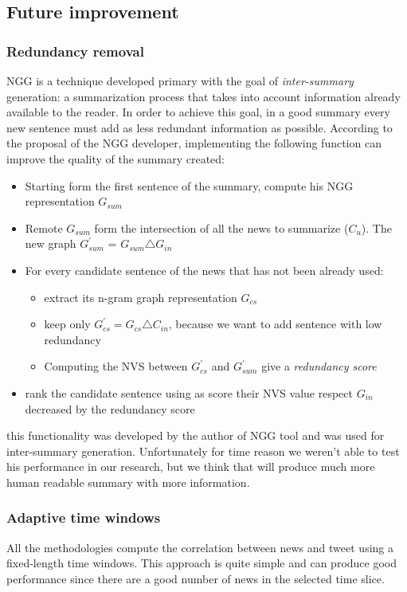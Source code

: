 \documentclass{acm_proc_article-sp-sigmod07}
\begin{document}
\subsection*{Future improvement}
\subsubsection*{Redundancy removal}
NGG is a technique developed primary with the goal of \emph{inter-summary} generation: a summarization process that takes into account information already available to the reader. In order to achieve this goal, in a good summary every new sentence must add as less redundant information as possible.
According to the proposal of the NGG developer, implementing the following function can improve the quality of the summary created:
\begin{itemize}
	\item Starting form the first sentence of the summary, compute his NGG representation $G_{sum}$
	\item Remote $G_{sum}$ form the intersection of all the news to summarize ($C_{u}$). The new graph $G_{sum}^{\prime}$ = $G_{sum} \triangle G_{in}$
	\item For every candidate sentence of the news that has not been already used:
	\begin{itemize}
		\item extract its n-gram graph representation $G_{cs}$
		\item keep only $G_{cs}^{\prime} = G_{cs} \triangle C_{in}$, because we want to add sentence with low redundancy
		\item Computing the NVS between $G_{cs}^{\prime}$ and $G_{sum}^{\prime}$ give a \emph{redundancy score}
	\end{itemize}
	\item rank the candidate sentence using as score their NVS value respect $G_{in}$ decreased by the redundancy score
\end{itemize}
this functionality was developed by the author of NGG tool and was used for inter-summary generation. Unfortunately for time reason we weren't able to test his performance in our research, but we think that will produce much more human readable summary with more information.

\subsubsection*{Adaptive time windows}
All the methodologies compute the correlation between news and tweet using a fixed-length time windows. This approach is quite simple and can produce good performance since there are a good number of news in the selected time slice. 
\end{document}
